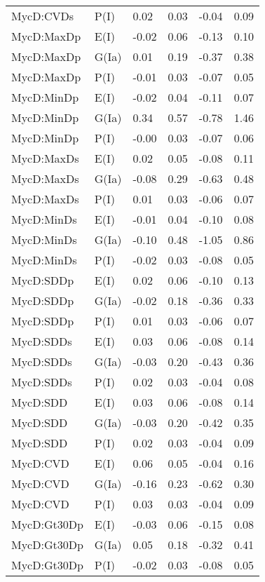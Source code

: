 \begin{center}
\begin{longtable}{|p{1.1in}|p{0.7in}|p{0.7in}|p{0.6in}|p{0.6in}|p{0.6in}|}
  MycD:CVDs & P(I) & 0.02 & 0.03 & -0.04 & 0.09 \\ 
  MycD:MaxDp & E(I) & -0.02 & 0.06 & -0.13 & 0.10 \\ 
  MycD:MaxDp & G(Ia) & 0.01 & 0.19 & -0.37 & 0.38 \\ 
  MycD:MaxDp & P(I) & -0.01 & 0.03 & -0.07 & 0.05 \\ 
  MycD:MinDp & E(I) & -0.02 & 0.04 & -0.11 & 0.07 \\ 
  MycD:MinDp & G(Ia) & 0.34 & 0.57 & -0.78 & 1.46 \\ 
  MycD:MinDp & P(I) & -0.00 & 0.03 & -0.07 & 0.06 \\ 
  MycD:MaxDs & E(I) & 0.02 & 0.05 & -0.08 & 0.11 \\ 
  MycD:MaxDs & G(Ia) & -0.08 & 0.29 & -0.63 & 0.48 \\ 
  MycD:MaxDs & P(I) & 0.01 & 0.03 & -0.06 & 0.07 \\ 
  MycD:MinDs & E(I) & -0.01 & 0.04 & -0.10 & 0.08 \\ 
  MycD:MinDs & G(Ia) & -0.10 & 0.48 & -1.05 & 0.86 \\ 
  MycD:MinDs & P(I) & -0.02 & 0.03 & -0.08 & 0.05 \\ 
  MycD:SDDp & E(I) & 0.02 & 0.06 & -0.10 & 0.13 \\ 
  MycD:SDDp & G(Ia) & -0.02 & 0.18 & -0.36 & 0.33 \\ 
  MycD:SDDp & P(I) & 0.01 & 0.03 & -0.06 & 0.07 \\ 
  MycD:SDDs & E(I) & 0.03 & 0.06 & -0.08 & 0.14 \\ 
  MycD:SDDs & G(Ia) & -0.03 & 0.20 & -0.43 & 0.36 \\ 
  MycD:SDDs & P(I) & 0.02 & 0.03 & -0.04 & 0.08 \\ 
  MycD:SDD & E(I) & 0.03 & 0.06 & -0.08 & 0.14 \\ 
  MycD:SDD & G(Ia) & -0.03 & 0.20 & -0.42 & 0.35 \\ 
  MycD:SDD & P(I) & 0.02 & 0.03 & -0.04 & 0.09 \\ 
  MycD:CVD & E(I) & 0.06 & 0.05 & -0.04 & 0.16 \\ 
  MycD:CVD & G(Ia) & -0.16 & 0.23 & -0.62 & 0.30 \\ 
  MycD:CVD & P(I) & 0.03 & 0.03 & -0.04 & 0.09 \\ 
  MycD:Gt30Dp & E(I) & -0.03 & 0.06 & -0.15 & 0.08 \\ 
  MycD:Gt30Dp & G(Ia) & 0.05 & 0.18 & -0.32 & 0.41 \\ 
  MycD:Gt30Dp & P(I) & -0.02 & 0.03 & -0.08 & 0.05 \\ 

\end{longtable}
\end{center}
